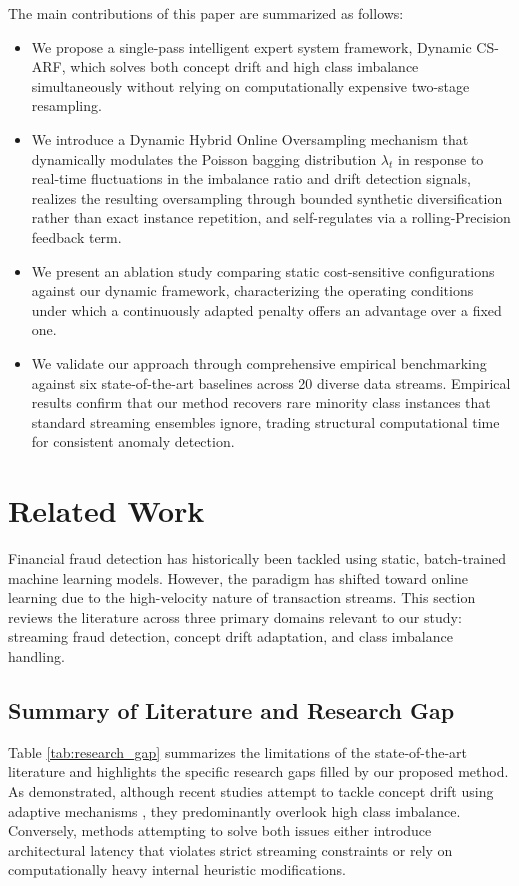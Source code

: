 \documentclass[review,12pt]{elsarticle}
\begin{document}
The main contributions of this paper are summarized as follows:
\begin{itemize}
    \item We propose a single-pass intelligent expert system framework, Dynamic CS-ARF, which solves both concept drift and high class imbalance simultaneously without relying on computationally expensive two-stage resampling.
    \item We introduce a Dynamic Hybrid Online Oversampling mechanism that dynamically modulates the Poisson bagging distribution $\lambda_t$ in response to real-time fluctuations in the imbalance ratio and drift detection signals, realizes the resulting oversampling through bounded synthetic diversification rather than exact instance repetition, and self-regulates via a rolling-Precision feedback term.
    \item We present an ablation study comparing static cost-sensitive configurations against our dynamic framework, characterizing the operating conditions under which a continuously adapted penalty offers an advantage over a fixed one.
    \item We validate our approach through comprehensive empirical benchmarking against six state-of-the-art baselines across 20 diverse data streams. Empirical results confirm that our method recovers rare minority class instances that standard streaming ensembles ignore, trading structural computational time for consistent anomaly detection.
\end{itemize}

\section{Related Work}
\label{sec:related_works}

Financial fraud detection has historically been tackled using static, batch-trained machine learning models. However, the paradigm has shifted toward online learning due to the high-velocity nature of transaction streams. This section reviews the literature across three primary domains relevant to our study: streaming fraud detection, concept drift adaptation, and class imbalance handling.

\subsection{Summary of Literature and Research Gap}
Table \ref{tab:research_gap} summarizes the limitations of the state-of-the-art literature and highlights the specific research gaps filled by our proposed method. As demonstrated, although recent studies attempt to tackle concept drift using adaptive mechanisms \cite{bayramImprovingFraudDetection2020a}, they predominantly overlook high class imbalance. Conversely, methods attempting to solve both issues \cite{sunTwostageCostsensitiveLearning2020a, loezer2020csarf, aguiarCSARF2023, brzezinskiOnlineOversampling2021} either introduce architectural latency that violates strict streaming constraints or rely on computationally heavy internal heuristic modifications. 
\end{document}
